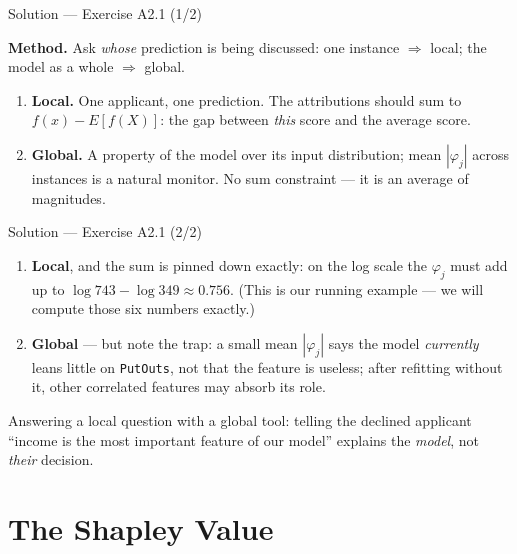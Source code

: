 \documentclass[aspectratio=169,11pt]{beamer}
\begin{document}
\begin{frame}{Solution --- Exercise A2.1 (1/2)}
\begin{solutionbox}
  \textbf{Method.} Ask \emph{whose} prediction is being discussed: one instance
  $\Rightarrow$ local; the model as a whole $\Rightarrow$ global.
  \begin{enumerate}
    \item \textbf{Local.} One applicant, one prediction. The attributions should sum to
          $f(x)-E[f(X)]$: the gap between \emph{this} score and the average score.
    \item \textbf{Global.} A property of the model over its input distribution;
          mean $|\varphi_j|$ across instances is a natural monitor. No sum constraint
          --- it is an average of magnitudes.
  \end{enumerate}
\end{solutionbox}
\end{frame}

\begin{frame}{Solution --- Exercise A2.1 (2/2)}
\begin{solutionbox}
  \begin{enumerate}
    \item \textbf{Local}, and the sum is pinned down exactly: on the log scale the
          $\varphi_j$ must add up to $\log 743 - \log 349 \approx 0.756$. (This is our
          running example --- we will compute those six numbers exactly.)
    \item \textbf{Global} --- but note the trap: a small mean $|\varphi_j|$ says the
          model \emph{currently} leans little on \texttt{PutOuts}, not that the feature
          is useless; after refitting without it, other correlated features may absorb
          its role.
  \end{enumerate}
\end{solutionbox}
\begin{mistake}
  Answering a local question with a global tool: telling the declined applicant
  ``income is the most important feature of our model'' explains the \emph{model},
  not \emph{their} decision.
\end{mistake}
\end{frame}

\section{The Shapley Value}
\end{document}
